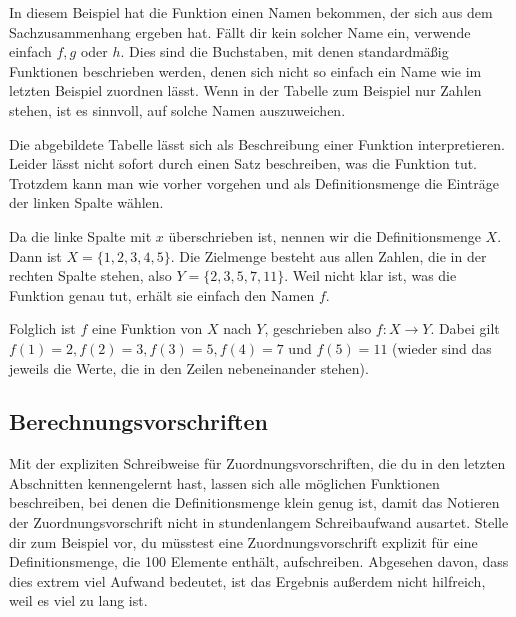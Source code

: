 \documentclass[../../main.tex]{subfiles}
\begin{document}
In diesem Beispiel hat die Funktion einen Namen bekommen, der sich aus dem Sachzusammenhang ergeben hat. Fällt dir kein solcher Name ein, verwende einfach $f, g$ oder $h$. Dies sind die Buchstaben, mit denen standardmäßig Funktionen beschrieben werden, denen sich nicht so einfach ein Name wie im letzten Beispiel zuordnen lässt. Wenn in der Tabelle zum Beispiel nur Zahlen stehen, ist es sinnvoll, auf solche Namen auszuweichen.

\begin{example}{}
    
    Die abgebildete Tabelle lässt sich als Beschreibung einer Funktion interpretieren. Leider lässt nicht sofort durch einen Satz beschreiben, was die Funktion tut. Trotzdem kann man wie vorher vorgehen und als Definitionsmenge die Einträge der linken Spalte wählen.
    
    Da die linke Spalte mit $x$ überschrieben ist, nennen wir die Definitionsmenge $X$. Dann ist $X=\{1,2,3,4,5\}$. Die Zielmenge besteht aus allen Zahlen, die in der rechten Spalte stehen, also $Y=\{2,3,5,7,11\}$. Weil nicht klar ist, was die Funktion genau tut, erhält sie einfach den Namen $f$.
    
    Folglich ist $f$ eine Funktion von $X$ nach $Y$, geschrieben also $f\colon X\rightarrow Y$. Dabei gilt $f(1)=2, f(2)=3, f(3)=5, f(4)=7$ und $f(5)=11$ (wieder sind das jeweils die Werte, die in den Zeilen nebeneinander stehen).
\end{example}

\subsection{Berechnungsvorschriften}
\label{sec:abbildungen_berechnungsvorschriften}

Mit der expliziten Schreibweise für Zuordnungsvorschriften, die du in den letzten Abschnitten kennengelernt hast, lassen sich alle möglichen Funktionen beschreiben, bei denen die Definitionsmenge klein genug ist, damit das Notieren der Zuordnungsvorschrift nicht in stundenlangem Schreibaufwand ausartet. Stelle dir zum Beispiel vor, du müsstest eine Zuordnungsvorschrift explizit für eine Definitionsmenge, die 100 Elemente enthält, aufschreiben. Abgesehen davon, dass dies extrem viel Aufwand bedeutet, ist das Ergebnis außerdem nicht hilfreich, weil es viel zu lang ist.
\end{document}

